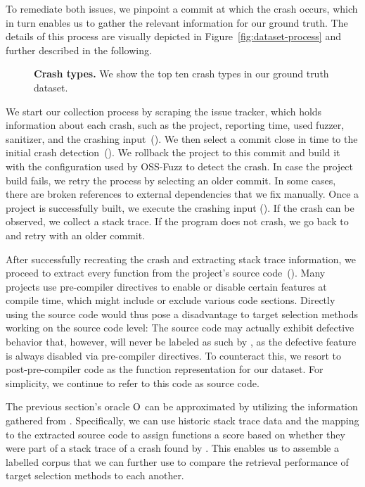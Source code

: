 To remediate both issues, we pinpoint a commit at which the crash occurs, which in turn enables us to gather the relevant information for our ground truth. The details of this process are visually depicted in Figure~\ref{fig:dataset-process} and further described in the following.

\begin{figure}
	\begin{center}
		
	\end{center}
	\caption{\textbf{Crash types.} \normalfont We show the top ten crash types in our ground truth dataset.}
	\label{fig:crash-types}
\end{figure}

We start our collection process by scraping the \ossfuzz{} issue tracker, which holds information about each crash, such as the project, reporting time, used fuzzer, sanitizer, and the crashing input~(\stepone). We then select a commit close in time to the initial crash detection~(\steptwo). We rollback the project to this commit and build it with the configuration used by OSS-Fuzz to detect the crash. In case the project build fails, we retry the process by selecting an older commit. In some cases, there are broken references to external dependencies that we fix manually. Once a project is successfully built, we execute the crashing input (\stepthree). If the crash can be observed, we collect a stack trace. If the program does not crash, we go back to \steptwo and retry with an older commit.

After successfully recreating the crash and extracting stack trace information, we proceed to extract every function from the project's source code~(\stepfour). Many projects use pre-compiler directives to enable or disable certain features at compile time, which might include or exclude various code sections. Directly using the source code would thus pose a disadvantage to target selection methods working on the source code level: The source code may actually exhibit defective behavior that, however, will never be labeled as such by \ossfuzz{}, as the defective feature is always disabled via pre-compiler directives. To counteract this, we resort to post-pre-compiler code as the function representation for our dataset. For simplicity, we continue to refer to this code as source code.

The previous section's oracle $\mathrm{O}$ can be approximated by utilizing the information gathered from \ossfuzz{}. Specifically, we can use historic stack trace data and the mapping to the extracted source code to assign functions a score based on whether they were part of a stack trace of a crash found by \ossfuzz{}. This enables us to assemble a labelled corpus that we can further use to compare the retrieval performance of target selection methods to each another.

